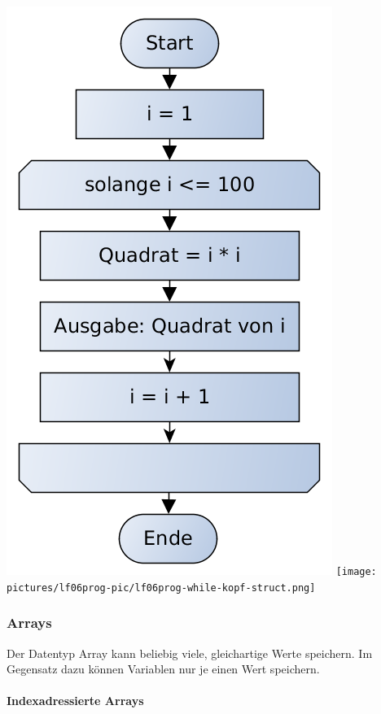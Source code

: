 \includegraphics[scale=0.4]{pictures/lf06prog-pic/lf06prog-while-kopf-pap.png}
\texttt{[image: pictures/lf06prog-pic/lf06prog-while-kopf-struct.png]}

\subsubsection{Arrays}

Der Datentyp Array kann beliebig viele, gleichartige Werte speichern. Im Gegensatz dazu können Variablen nur je einen Wert speichern. 

\paragraph{Indexadressierte Arrays}~\\

